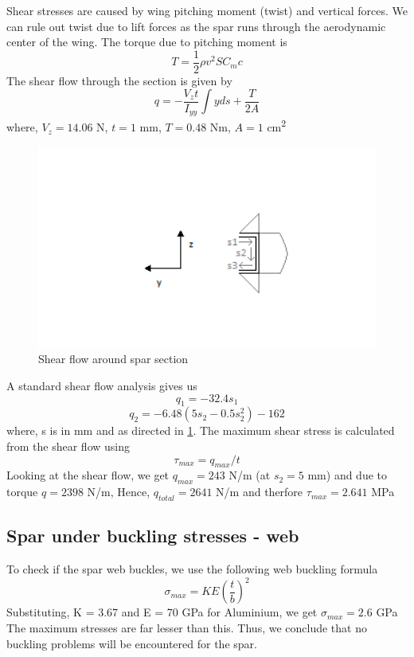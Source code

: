 Shear stresses are caused by wing pitching moment (twist) and vertical forces. We can rule out twist due to lift forces as the spar runs through the aerodynamic center of the wing. The torque due to pitching moment is 
\begin{equation} T = \frac{1}{2}\rho v^2SC_mc \end{equation}
The shear flow through the section is given by
\begin{equation} q = -\frac{V_zt}{I_{yy}}\int{yds} + \frac{T}{2A} \end{equation}
where, $V_z = 14.06$ N, $t = 1$ mm, $T = 0.48$ Nm, $A = 1$ cm\textsuperscript{2}\\
\begin{figure}[H]
    \begin{center}
      \includegraphics[width=5.2in]{figures/airfoil_stress.png}
\caption{Shear flow around spar section}
       \label{fig:shearflow}
    \end{center}
\end{figure}
A standard shear flow analysis gives us
\[ q_1 = -32.4s_1\]
\[ q_2 = -6.48(5s_2 - 0.5s_2^2)-162\]
where, s is in mm and as directed in \ref{fig:shearflow}. The maximum shear stress is calculated from the shear flow using
\begin{equation} \tau_{max} = q_{max}/t \end{equation}
Looking at the shear flow, we get $q_{max} = 243$ N/m (at $s_2 = 5$ mm) and due to torque $q = 2398$ N/m, Hence, $q_{total} = 2641$ N/m and therfore $\tau_{max} = 2.641$ MPa

\subsection{Spar under buckling stresses - web}
To check if the spar web buckles, we use the following web buckling formula
\begin{equation} \sigma_{max} = KE\left(\frac{t}{b}\right)^2 \end{equation}
Substituting, K = 3.67 and E = 70 GPa for Aluminium, we get $\sigma_{max} = 2.6$ GPa \\

The maximum stresses are far lesser than this. Thus, we conclude that no buckling problems will be encountered for the spar.
%
%
